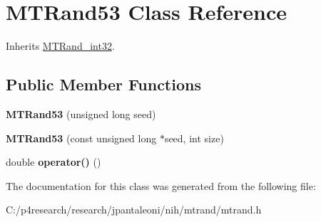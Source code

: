 \hypertarget{class_m_t_rand53}{
\section{\-M\-T\-Rand53 \-Class \-Reference}
\label{class_m_t_rand53}
}


\-Inherits \hyperlink{class_m_t_rand__int32}{\-M\-T\-Rand\-\_\-int32}.

\subsection*{\-Public \-Member \-Functions}
\begin{DoxyCompactItemize}
\item 
\hypertarget{class_m_t_rand53_ad800887e15d4095f22facdb67f270c5e}{
{\bfseries \-M\-T\-Rand53} (unsigned long seed)}
\label{class_m_t_rand53_ad800887e15d4095f22facdb67f270c5e}

\item 
\hypertarget{class_m_t_rand53_ac77b190d3ac27adea2d2c6c2ce2347c3}{
{\bfseries \-M\-T\-Rand53} (const unsigned long $\ast$seed, int size)}
\label{class_m_t_rand53_ac77b190d3ac27adea2d2c6c2ce2347c3}

\item 
\hypertarget{class_m_t_rand53_ab6657cb5349f39bc4553d3a970458b45}{
double {\bfseries operator()} ()}
\label{class_m_t_rand53_ab6657cb5349f39bc4553d3a970458b45}

\end{DoxyCompactItemize}


\-The documentation for this class was generated from the following file\-:\begin{DoxyCompactItemize}
\item 
\-C\-:/p4research/research/jpantaleoni/nih/mtrand/mtrand.\-h\end{DoxyCompactItemize}
